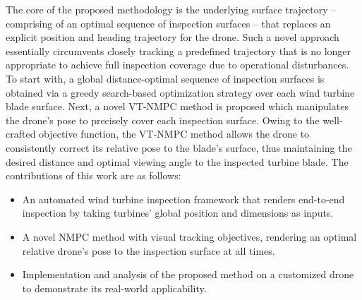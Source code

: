 \documentclass[letterpaper, 10 pt, conference]{ieeeconf}  %
\begin{document}
The core of the proposed methodology is the underlying surface trajectory -- comprising of an optimal sequence of inspection surfaces -- that replaces an explicit position and heading trajectory for the drone. Such a novel approach essentially circumvents closely tracking a predefined trajectory that is no longer appropriate to achieve full inspection coverage due to operational disturbances. To start with, a global distance-optimal sequence of inspection surfaces is obtained via a greedy search-based optimization strategy over each wind turbine blade surface. Next, a novel \ac{VT-NMPC} method is proposed which manipulates the drone's pose to precisely cover each inspection surface. Owing to the well-crafted objective function, the \ac{VT-NMPC} method allows the drone to consistently correct its relative pose to the blade's surface, thus maintaining the desired distance and optimal viewing angle to the inspected turbine blade. %
The contributions of this work are as follows:


\begin{itemize}
    \item %
    An automated wind turbine inspection framework that renders end-to-end inspection by taking turbines' global position and dimensions as inputs.
 

    \item A novel \ac{NMPC} method with visual tracking objectives, rendering an optimal relative drone's pose to the inspection surface at all times. 
    
    \item Implementation and analysis of the proposed method
on a customized drone to demonstrate its real-world applicability.

\end{itemize}
\end{document}
